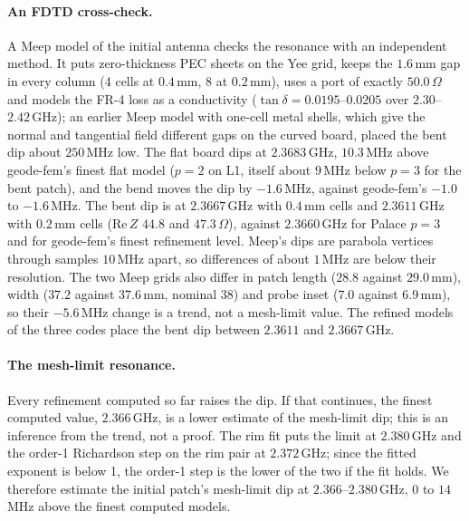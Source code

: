 \documentclass{anvil-paper}
\begin{document}
\paragraph{An FDTD cross-check.}
A Meep \citep{oskooi2010meep} model of the initial antenna checks the
resonance with an independent method. It puts zero-thickness PEC sheets on
the Yee grid, keeps the $1.6$\,mm gap in every column (4 cells at $0.4$\,mm, 8
at $0.2$\,mm), uses a port of exactly $50.0\,\Omega$ and models the FR-4 loss
as a conductivity ($\tan\delta = 0.0195$--$0.0205$ over $2.30$--$2.42$\,GHz);
an earlier Meep model with one-cell metal shells, which give the normal and
tangential field different gaps on the curved board, placed the bent dip
about $250$\,MHz low. The flat board dips at $2.3683$\,GHz, $10.3$\,MHz above
geode-fem's finest flat model ($p = 2$ on L1, itself about $9$\,MHz below
$p = 3$ for the bent patch), and the bend moves the dip by $-1.6$\,MHz,
against geode-fem's $-1.0$ to $-1.6$\,MHz. The bent dip is at $2.3667$\,GHz
with $0.4$\,mm cells and $2.3611$\,GHz with $0.2$\,mm cells
($\mathrm{Re}\,Z$ $44.8$ and $47.3\,\Omega$), against $2.3660$\,GHz for Palace
$p = 3$ and for geode-fem's finest refinement level. Meep's dips are parabola vertices
through samples $10$\,MHz apart, so differences of about $1$\,MHz are below
their resolution. The two Meep grids also differ in patch length ($28.8$
against $29.0$\,mm), width ($37.2$ against $37.6$\,mm, nominal $38$) and probe
inset ($7.0$ against $6.9$\,mm), so their $-5.6$\,MHz change is a trend, not a
mesh-limit value. The refined models of the three codes place the bent dip
between $2.3611$ and $2.3667$\,GHz.

\paragraph{The mesh-limit resonance.}
Every refinement computed so far raises the dip. If that continues, the
finest computed value, $2.366$\,GHz, is a lower estimate of the mesh-limit
dip; this is an inference from the trend, not a proof. The rim fit puts the limit at $2.380$\,GHz and the order-1
Richardson step on the rim pair at $2.372$\,GHz; since the fitted exponent
is below 1, the order-1 step is the lower of the two if the fit holds. We
therefore estimate the initial patch's mesh-limit dip at
$2.366$--$2.380$\,GHz, $0$ to $14$\,MHz above the finest computed models.
\end{document}
